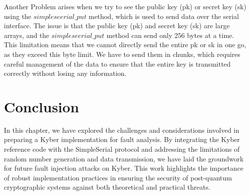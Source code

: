 Another Problem arises when we try to see the public key (pk) or secret key (sk) using the $simpleseerial\_put$ method, which is used to send data over the serial interface. The issue is that the public key (pk) and secret key (sk) are large arrays, and the $simpleseerial\_put$ method can send only 256 bytes at a time. This limitation means that we cannot directly send the entire pk or sk in one go, as they exceed this byte limit. We have to send them in chunks, which requires careful management of the data to ensure that the entire key is transmitted correctly without losing any information. 

\section{Conclusion}
In this chapter, we have explored the challenges and considerations involved in preparing a Kyber implementation for fault analysis. By integrating the Kyber reference code with the SimpleSerial protocol and addressing the limitations of random number generation and data transmission, we have laid the groundwork for future fault injection attacks on Kyber. This work highlights the importance of robust implementation practices in ensuring the security of post-quantum cryptographic systems against both theoretical and practical threats.